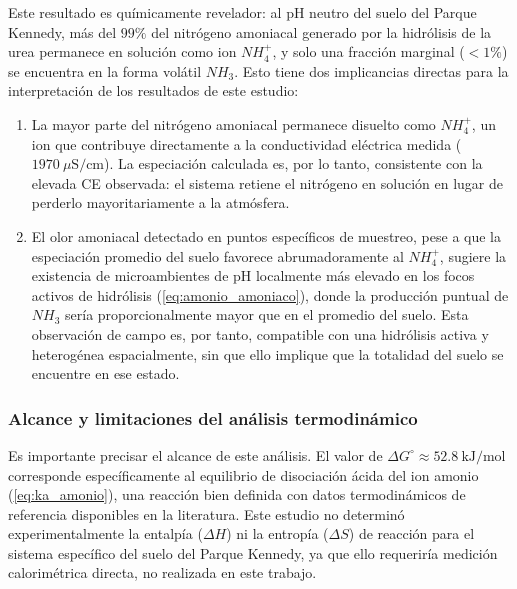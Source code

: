 \documentclass[fleqn]{jaes}
\begin{document}
Este resultado es químicamente revelador: al pH neutro del suelo del Parque Kennedy, más del $99\%$ del nitrógeno amoniacal generado por la hidrólisis de la urea permanece en solución como ion $NH_4^+$, y solo una fracción marginal ($<1\%$) se encuentra en la forma volátil $NH_3$. Esto tiene dos implicancias directas para la interpretación de los resultados de este estudio:

\begin{enumerate}
  \item La mayor parte del nitrógeno amoniacal permanece disuelto como $NH_4^+$, un ion que contribuye directamente a la conductividad eléctrica medida ($1970~\mu\text{S/cm}$). La especiación calculada es, por lo tanto, consistente con la elevada CE observada: el sistema retiene el nitrógeno en solución en lugar de perderlo mayoritariamente a la atmósfera.
  \item El olor amoniacal detectado en puntos específicos de muestreo, pese a que la especiación promedio del suelo favorece abrumadoramente al $NH_4^+$, sugiere la existencia de microambientes de pH localmente más elevado en los focos activos de hidrólisis (\cref{eq:amonio_amoniaco}), donde la producción puntual de $NH_3$ sería proporcionalmente mayor que en el promedio del suelo. Esta observación de campo es, por tanto, compatible con una hidrólisis activa y heterogénea espacialmente, sin que ello implique que la totalidad del suelo se encuentre en ese estado.
\end{enumerate}

\subsubsection{Alcance y limitaciones del análisis termodinámico}\label{subsubsec:limitaciones_termo}

Es importante precisar el alcance de este análisis. El valor de $\Delta G^\circ \approx 52.8~\text{kJ/mol}$ corresponde específicamente al equilibrio de disociación ácida del ion amonio (\cref{eq:ka_amonio}), una reacción bien definida con datos termodinámicos de referencia disponibles en la literatura. Este estudio no determinó experimentalmente la entalpía ($\Delta H$) ni la entropía ($\Delta S$) de reacción para el sistema específico del suelo del Parque Kennedy, ya que ello requeriría medición calorimétrica directa, no realizada en este trabajo.
\end{document}
